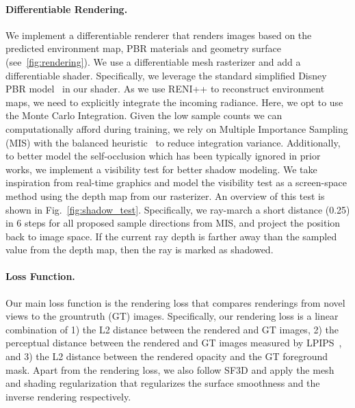 \paragraph{Differentiable Rendering.}
We implement a differentiable renderer that renders images based on the predicted environment map, PBR materials and geometry surface (see~\cref{fig:rendering}). We use a differentiable mesh rasterizer and add a differentiable shader. Specifically, we leverage the standard simplified Disney PBR model~\cite{Burley2012} in our shader. As we use RENI++ to reconstruct environment maps, we need to explicitly integrate the incoming radiance. Here, we opt to use the Monte Carlo Integration. Given the low sample counts we can computationally afford during training, we rely on Multiple Importance Sampling (MIS) with the balanced heuristic~\cite{VeachPhD} to reduce integration variance. Additionally, to better model the self-occlusion which has been typically ignored in prior works, we implement a visibility test for better shadow modeling. We take inspiration from real-time graphics and model the visibility test as a screen-space method using the depth map from our rasterizer. An overview of this test is shown in Fig.~\ref{fig:shadow_test}. Specifically, we ray-march a short distance (0.25) in 6 steps for all proposed sample directions from MIS, and project the position back to image space. If the current ray depth is farther away than the sampled value from the depth map, then the ray is marked as shadowed. 

\paragraph{Loss Function.}
Our main loss function is the rendering loss that compares renderings from novel views to the grountruth (GT) images. Specifically, our rendering loss is a linear combination of 1) the L2 distance between the rendered and GT images, 2) the perceptual distance between the rendered and GT images measured by LPIPS~\cite{zhang2018perceptual}, and 3) the L2 distance between the rendered opacity and the GT foreground mask. Apart from the rendering loss, we also follow SF3D and apply the mesh and shading regularization that regularizes the surface smoothness and the inverse rendering respectively. 

